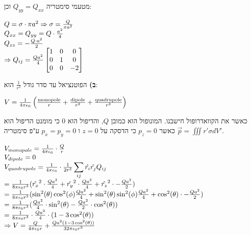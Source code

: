 \documentclass[14pt]{extarticle}
\makeatletter
\newenvironment{lefteqs}{%
    \begin{english}%
    \begin{flushleft}%
    \renewcommand{\arraystretch}{1.3}%
    $\begin{array}{@{}l@{}}%
}{%
    \end{array}$%
    \end{flushleft}%
    \end{english}%
}
\makeatother
\begin{document}
מטעמי סימטריה $Q_{yy}=Q_{xx}$ וכן:

\begin{lefteqs}
    Q=\sigma \cdot \pi a^2 \Rightarrow \sigma = \frac{Q}{\pi a^2} \\
    Q_{xx} = Q_{yy} = Q \cdot \frac{a^2}{4} \\
    Q_{zz} = -\frac{Q \cdot a^2}{2} \\
    \Rightarrow Q_{ij} = \frac{Qa^2}{4}\begin{bmatrix}
    1 & 0 & 0 \\
    0 & 1 & 0 \\
    0 & 0 & -2
    \end{bmatrix}
\end{lefteqs}

\textbf{ב)}
הפוטנציאל עד סדר גודל $\frac{1}{r^3}$ הוא:
\begin{lefteqs}
    V = \frac{1}{4\pi \epsilon_0} \left( \frac{\text{monopole}}{r} + \frac{\text{dipole}}{r^2} + \frac{\text{quadrupole}}{r^3} \right) \\
\end{lefteqs}
כאשר את הקוואדרופול חישבנו. המונופול הוא כמובן $Q$, והדיפול הוא 0 כי מומנט הדיפול הוא $\vec{p} = \iiint r\prime \sigma dV\prime$ כאשר $p_z=0$ כי הדסקה על $z=0$
ו $p_x=p_y=0$ ע"פ סימטריה.

\begin{lefteqs}
    V_{monopole} = \frac{1}{4\pi \epsilon_0} \cdot \frac{Q}{r} \\
    V_{dipole} = 0 \\
    V_{quadrupole} = \frac{1}{4\pi \epsilon_0} \cdot \frac{1}{2r^3} \displaystyle \sum_{ij} \hat{r_i} \hat{r_j} Q_{ij} \\
    = \frac{1}{8\pi \epsilon_0 r^3} (\hat{r_x}^2 \cdot \frac{Qa^2}{4} + \hat{r_y}^2 \cdot \frac{Qa^2}{4} + \hat{r_z}^2 \cdot -\frac{Qa^2}{2}) \\
    = \frac{1}{8\pi \epsilon_0 r^3} (\sin^2(\theta)\cos^2(\phi)\frac{Qa^2}{4} + \sin^2(\theta)\sin^2(\phi)\frac{Qa^2}{4} + \cos^2(\theta) \cdot -\frac{Qa^2}{2}) \\
    = \frac{1}{8\pi \epsilon_0 r^3} (\frac{Qa^2}{4} \cdot \sin^2(\theta) - \frac{Qa^2}{2} \cdot \cos^2(\theta)) \\
    = \frac{1}{8\pi \epsilon_0 r^3} \cdot \frac{Qa^2}{4} \cdot (1 - 3\cos^2(\theta)) \\
    \Rightarrow V = \frac{Q}{4\pi\epsilon_0 r} + \frac{Qa^2(1-3\cos^2(\theta))}{32\pi \epsilon_0 r^3}
\end{lefteqs}
\end{document}
